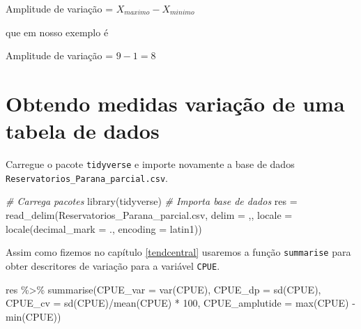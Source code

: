 \documentclass[
]{book}
\newenvironment{Shaded}{\begin{snugshade}}{\end{snugshade}}
\newcommand{\AttributeTok}[1]{\textcolor[rgb]{0.77,0.63,0.00}{#1}}
\newcommand{\CommentTok}[1]{\textcolor[rgb]{0.56,0.35,0.01}{\textit{#1}}}
\newcommand{\DecValTok}[1]{\textcolor[rgb]{0.00,0.00,0.81}{#1}}
\newcommand{\FunctionTok}[1]{\textcolor[rgb]{0.00,0.00,0.00}{#1}}
\newcommand{\NormalTok}[1]{#1}
\newcommand{\OtherTok}[1]{\textcolor[rgb]{0.56,0.35,0.01}{#1}}
\newcommand{\SpecialCharTok}[1]{\textcolor[rgb]{0.00,0.00,0.00}{#1}}
\newcommand{\StringTok}[1]{\textcolor[rgb]{0.31,0.60,0.02}{#1}}
\begin{document}
Amplitude de variação = \(X_{maximo} - X_{minimo}\)

que em nosso exemplo é

Amplitude de variação = \(9 - 1 = 8\)

\hypertarget{obtendo-medidas-variauxe7uxe3o-de-uma-tabela-de-dados}{%
\section{Obtendo medidas variação de uma tabela de dados}\label{obtendo-medidas-variauxe7uxe3o-de-uma-tabela-de-dados}}

Carregue o pacote \texttt{tidyverse} e importe novamente a base de dados \texttt{Reservatorios\_Parana\_parcial.csv}.

\begin{Shaded}
\begin{Highlighting}[]
\CommentTok{\# Carrega pacotes}
\FunctionTok{library}\NormalTok{(tidyverse)}
\CommentTok{\# Importa base de dados }
\NormalTok{res }\OtherTok{=} \FunctionTok{read\_delim}\NormalTok{(}\StringTok{\textquotesingle{}Reservatorios\_Parana\_parcial.csv\textquotesingle{}}\NormalTok{,}
                  \AttributeTok{delim =} \StringTok{\textquotesingle{},\textquotesingle{}}\NormalTok{,}
                  \AttributeTok{locale =} \FunctionTok{locale}\NormalTok{(}\AttributeTok{decimal\_mark =} \StringTok{\textquotesingle{}.\textquotesingle{}}\NormalTok{,}
                                  \AttributeTok{encoding =} \StringTok{\textquotesingle{}latin1\textquotesingle{}}\NormalTok{))}
\end{Highlighting}
\end{Shaded}

Assim como fizemos no capítulo \ref{tendcentral} usaremos a função \texttt{summarise} para obter descritores de variação para a variável \texttt{CPUE}.

\begin{Shaded}
\begin{Highlighting}[]
\NormalTok{res }\SpecialCharTok{\%\textgreater{}\%} 
  \FunctionTok{summarise}\NormalTok{(}\AttributeTok{CPUE\_var =} \FunctionTok{var}\NormalTok{(CPUE),}
            \AttributeTok{CPUE\_dp =} \FunctionTok{sd}\NormalTok{(CPUE),}
            \AttributeTok{CPUE\_cv =} \FunctionTok{sd}\NormalTok{(CPUE)}\SpecialCharTok{/}\FunctionTok{mean}\NormalTok{(CPUE) }\SpecialCharTok{*} \DecValTok{100}\NormalTok{,}
            \AttributeTok{CPUE\_amplutide =} \FunctionTok{max}\NormalTok{(CPUE) }\SpecialCharTok{{-}} \FunctionTok{min}\NormalTok{(CPUE))}
\end{Highlighting}
\end{Shaded}
\end{document}
